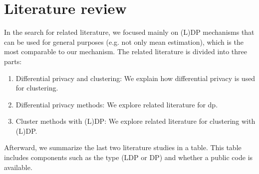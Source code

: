 \section{Literature review} \label{theory:literature-review}
In the search for related literature, we focused mainly on (L)DP mechanisms that can be used for general purposes (e.g. not only mean estimation), which is the most comparable to our mechanism.
The related literature is divided into three parts:
\begin{enumerate}
  \item Differential privacy and clustering: We explain how differential privacy is used for clustering.
  \item Differential privacy methods: We explore related literature for \gls{dp}.
  \item Cluster methods with (L)DP: We explore related literature for clustering with (L)DP.
\end{enumerate}
Afterward, we summarize the last two literature studies in a table.
This table includes components such as the type (LDP or DP) and whether a public code is available.

